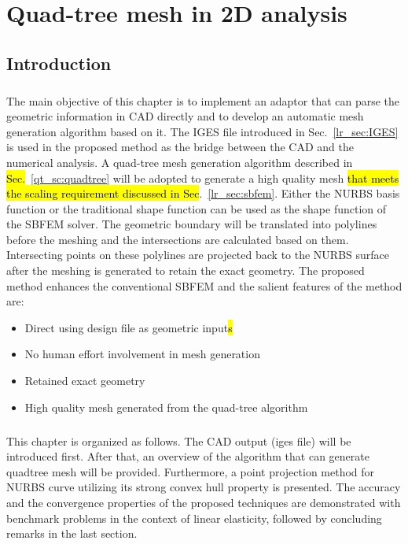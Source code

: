 \chapter{Quad-tree mesh in 2D analysis}
\label{qdt_sec:main}
\section{Introduction}
\paragraph{}
The main objective of this chapter is to implement an adaptor that can parse the geometric information in CAD directly and to develop an automatic mesh generation algorithm based on it.
The IGES file introduced in Sec.~\ref{lr_sec:IGES} is used in the proposed method as the bridge between the CAD and the numerical analysis.
A quad-tree mesh generation algorithm described in \hl{Sec.}~\ref{qt_sc:quadtree} will be adopted to generate a high quality mesh \hl{that meets the scaling requirement discussed in Sec}.~\ref{lr_sec:sbfem}.
Either the NURBS basis function or the traditional shape function can be used as the shape function of the SBFEM solver.
The geometric boundary will be translated into polylines before the meshing and the intersections are calculated based on them.
Intersecting points on these polylines are projected back to the NURBS surface after the meshing is generated to retain the exact geometry.
The proposed method enhances the conventional SBFEM and the salient features of the method are:
    \begin{itemize}
        \item Direct using design file as geometric input\hl{s}
        \item No human effort involvement in mesh generation
        \item Retained exact geometry
        \item High quality mesh generated from the quad-tree algorithm
    \end{itemize}
\paragraph{}
This chapter is organized as follows.
The CAD output (iges file) will be introduced first.
After that, an overview of the algorithm that can generate quadtree mesh will be provided.
Furthermore, a point projection method for NURBS curve utilizing its strong convex hull property is presented.
The accuracy and the convergence properties of the proposed techniques are demonstrated with benchmark problems in the context of linear elasticity, followed by concluding remarks in the last section.


